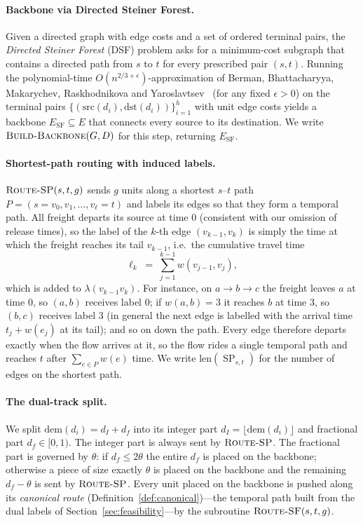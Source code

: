 \documentclass[11pt]{article}
\theoremstyle{definition}
\theoremstyle{remark}
\newcommand{\ESF}{E_{\mathrm{SF}}}
\newcommand{\src}{\mathrm{src}}
\newcommand{\dst}{\mathrm{dst}}
\newcommand{\dem}{\mathrm{dem}}
\newcommand{\len}{\mathrm{len}}
\DeclareMathOperator{\SP}{SP}
\begin{document}
\paragraph{Backbone via Directed Steiner Forest.}
Given a directed graph with edge costs and a set of ordered terminal pairs, the \emph{Directed Steiner
Forest} (DSF) problem asks for a minimum-cost subgraph that contains a directed path from $s$ to $t$
for every prescribed pair $(s,t)$. Running the polynomial-time $O(n^{2/3+\epsilon})$-approximation of
Berman, Bhattacharyya, Makarychev, Raskhodnikova and Yaroslavtsev~\cite{BBMRY13} (for any fixed
$\epsilon>0$) on the terminal pairs $\{(\src(d_i),\dst(d_i))\}_{i=1}^{h}$ with unit edge costs yields a
backbone $\ESF\subseteq E$ that connects every source to its destination. We write
$\textsc{Build-Backbone}(G,D)$ for this step, returning $\ESF$.

\paragraph{Shortest-path routing with induced labels.}
$\textsc{Route-SP}(s,t,g)$ sends $g$ units along a shortest $s$--$t$ path
$P=(s=v_0,v_1,\dots,v_\ell=t)$ and labels its edges so that they form a temporal path. All freight
departs its source at time $0$ (consistent with our omission of release times), so the label of the
$k$-th edge $(v_{k-1},v_k)$ is simply the time at which the freight reaches its tail $v_{k-1}$, i.e.\
the cumulative travel time
\[
  \ell_k \;=\; \sum_{j=1}^{k-1} w(v_{j-1},v_j),
\]
which is added to $\lambda(v_{k-1}v_k)$. For instance, on $a\to b\to c$ the freight leaves $a$ at time
$0$, so $(a,b)$ receives label $0$; if $w(a,b)=3$ it reaches $b$ at time $3$, so $(b,c)$ receives label
$3$ (in general the next edge is labelled with the arrival time $t_j+w(e_j)$ at its tail); and so on
down the path. Every edge therefore departs exactly when the flow arrives at it, so the flow rides a
single temporal path and reaches $t$ after $\sum_{e\in P}w(e)$ time. We write $\len(\SP_{s,t})$ for the
number of edges on the shortest path.

\paragraph{The dual-track split.}
We split $\dem(d_i)=d_I+d_f$ into its integer part $d_I=\lfloor\dem(d_i)\rfloor$ and fractional part
$d_f\in[0,1)$. The integer part is always sent by $\textsc{Route-SP}$. The fractional part is governed
by $\theta$: if $d_f\le 2\theta$ the entire $d_f$ is placed on the backbone; otherwise a piece of size
exactly $\theta$ is placed on the backbone and the remaining $d_f-\theta$ is sent by
$\textsc{Route-SP}$. Every unit placed on the backbone is pushed along its \emph{canonical route}
(Definition~\ref{def:canonical})---the temporal path built from the dual labels of
Section~\ref{sec:feasibility}---by the subroutine $\textsc{Route-SF}(s,t,g)$.
\end{document}

